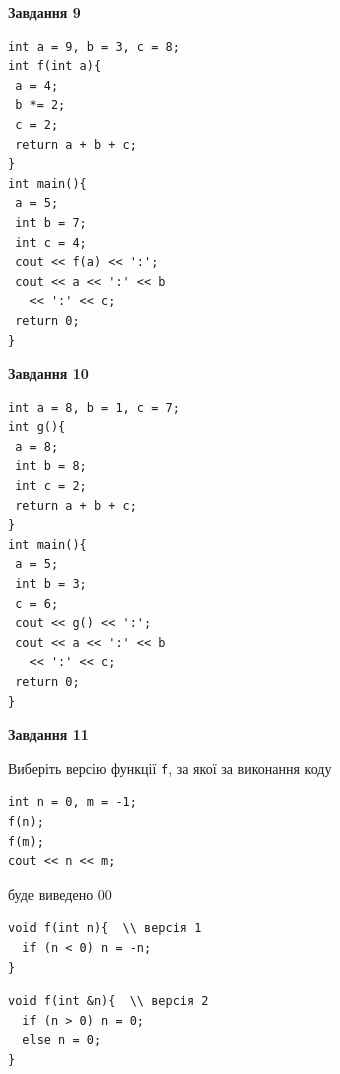 \documentclass[12pt, ukrainian]{article}
\def\code#1{\Verb!#1!}
\begin{document}
{\begin {large}
\begin{minipage}[t]{11.0cm}
\end{minipage}


\begin{minipage}[t]{7.0cm}

\begin{center}
\textbf{Завдання 9}
\end{center}
\vspace{-8mm}

\begin{verbatim}
int a = 9, b = 3, c = 8;
int f(int a){
 a = 4;
 b *= 2;
 c = 2;
 return a + b + c;
}
int main(){
 a = 5;
 int b = 7;
 int c = 4;
 cout << f(a) << ':';
 cout << a << ':' << b 
   << ':' << c;
 return 0;
}
\end{verbatim}



\begin{center}
\textbf{Завдання 10}
\end{center}
\vspace{-8mm}

\begin{verbatim}
int a = 8, b = 1, c = 7;
int g(){
 a = 8;
 int b = 8;
 int c = 2;
 return a + b + c;
}
int main(){
 a = 5;
 int b = 3;
 c = 6;
 cout << g() << ':';
 cout << a << ':' << b 
   << ':' << c;
 return 0;
}
\end{verbatim}

\end{minipage}
\vline \hspace{1mm}
\begin{minipage}[t]{11.0cm}

\begin{center}
\textbf{Завдання 11}
\end{center}
Виберіть версію функції \code{f}, за якої за виконання коду
\begin{verbatim}
int n = 0, m = -1;
f(n);
f(m);
cout << n << m;
\end{verbatim}

буде виведено 00

\begin{verbatim}
void f(int n){  \\ версія 1
  if (n < 0) n = -n;
}
\end{verbatim}

\vspace{-8mm}\begin{verbatim}
void f(int &n){  \\ версія 2
  if (n > 0) n = 0;
  else n = 0;
}
\end{verbatim}


\end{minipage}
\end{large}}
\end{document}
